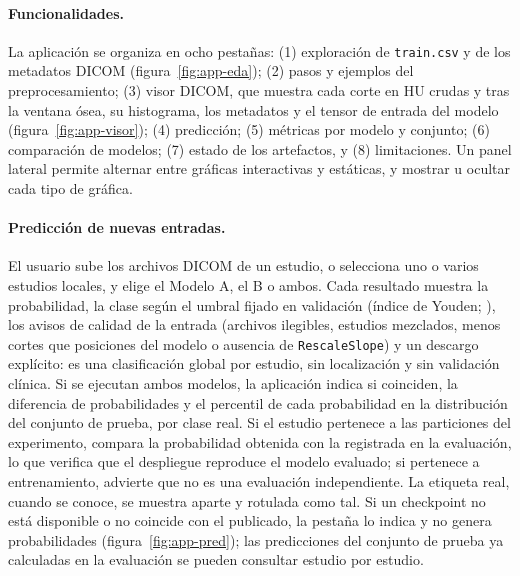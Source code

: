 \paragraph{Funcionalidades.} La aplicaci\'on se organiza en ocho pesta\~nas: (1) exploraci\'on de \texttt{train.csv} y de los metadatos DICOM (figura~\ref{fig:app-eda}); (2) pasos y ejemplos del preprocesamiento; (3) visor DICOM, que muestra cada corte en HU crudas y tras la ventana \'osea, su histograma, los metadatos y el tensor de entrada del modelo (figura~\ref{fig:app-visor}); (4) predicci\'on; (5) m\'etricas por modelo y conjunto; (6) comparaci\'on de modelos; (7) estado de los artefactos, y (8) limitaciones. Un panel lateral permite alternar entre gr\'aficas interactivas y est\'aticas, y mostrar u ocultar cada tipo de gr\'afica.

\paragraph{Predicci\'on de nuevas entradas.} El usuario sube los archivos DICOM de un estudio, o selecciona uno o varios estudios locales, y elige el Modelo A, el B o ambos. Cada resultado muestra la probabilidad, la clase seg\'un el umbral fijado en validaci\'on (\'indice de Youden; \citealp{youden1950index}), los avisos de calidad de la entrada (archivos ilegibles, estudios mezclados, menos cortes que posiciones del modelo o ausencia de \texttt{RescaleSlope}) y un descargo expl\'icito: es una clasificaci\'on global por estudio, sin localizaci\'on y sin validaci\'on cl\'inica. Si se ejecutan ambos modelos, la aplicaci\'on indica si coinciden, la diferencia de probabilidades y el percentil de cada probabilidad en la distribuci\'on del conjunto de prueba, por clase real. Si el estudio pertenece a las particiones del experimento, compara la probabilidad obtenida con la registrada en la evaluaci\'on, lo que verifica que el despliegue reproduce el modelo evaluado; si pertenece a entrenamiento, advierte que no es una evaluaci\'on independiente. La etiqueta real, cuando se conoce, se muestra aparte y rotulada como tal. Si un checkpoint no est\'a disponible o no coincide con el publicado, la pesta\~na lo indica y no genera probabilidades (figura~\ref{fig:app-pred}); las predicciones del conjunto de prueba ya calculadas en la evaluaci\'on se pueden consultar estudio por estudio.

